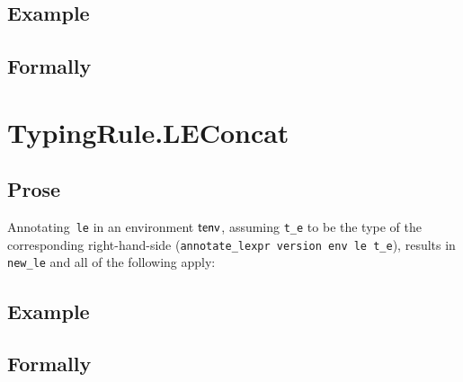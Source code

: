 \documentclass{book}
\begin{document}
  \subsection{Example}



\begin{emptyformal}
    \subsection{Formally}
\end{emptyformal}


\section{TypingRule.LEConcat \label{sec:TypingRule.LEConcat}}

    \subsection{Prose}
   Annotating~\texttt{le} in an environment $\textsf{tenv}$, assuming
\texttt{t\_e} to be the type of the corresponding right-hand-side
(\texttt{annotate\_lexpr version env le t\_e}), results in \texttt{new\_le} and
all of the following apply:

  \subsection{Example}



\begin{emptyformal}
    \subsection{Formally}

\end{emptyformal}


\end{document}
